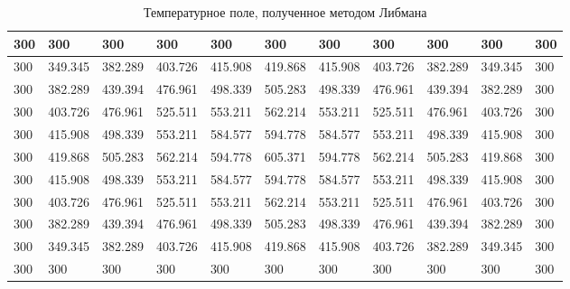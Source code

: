 \documentclass[12pt, a4paper]{article}
\begin{document}
\begin{table}[ht]
	\small
	\caption{Температурное поле, полученное методом Либмана}
	\label{tbl:liebman}
	\begin{tabular}{|l|l|l|l|l|l|l|l|l|l|l|}
		\hline
		300 & 300     & 300     & 300     & 300     & 300     & 300     & 300     & 300     & 300     & 300 \\ \hline
		300 & 349.345 & 382.289 & 403.726 & 415.908 & 419.868 & 415.908 & 403.726 & 382.289 & 349.345 & 300 \\ \hline
		300 & 382.289 & 439.394 & 476.961 & 498.339 & 505.283 & 498.339 & 476.961 & 439.394 & 382.289 & 300 \\ \hline
		300 & 403.726 & 476.961 & 525.511 & 553.211 & 562.214 & 553.211 & 525.511 & 476.961 & 403.726 & 300 \\ \hline
		300 & 415.908 & 498.339 & 553.211 & 584.577 & 594.778 & 584.577 & 553.211 & 498.339 & 415.908 & 300 \\ \hline
		300 & 419.868 & 505.283 & 562.214 & 594.778 & 605.371 & 594.778 & 562.214 & 505.283 & 419.868 & 300 \\ \hline
		300 & 415.908 & 498.339 & 553.211 & 584.577 & 594.778 & 584.577 & 553.211 & 498.339 & 415.908 & 300 \\ \hline
		300 & 403.726 & 476.961 & 525.511 & 553.211 & 562.214 & 553.211 & 525.511 & 476.961 & 403.726 & 300 \\ \hline
		300 & 382.289 & 439.394 & 476.961 & 498.339 & 505.283 & 498.339 & 476.961 & 439.394 & 382.289 & 300 \\ \hline
		300 & 349.345 & 382.289 & 403.726 & 415.908 & 419.868 & 415.908 & 403.726 & 382.289 & 349.345 & 300 \\ \hline
		300 & 300     & 300     & 300     & 300     & 300     & 300     & 300     & 300     & 300     & 300 \\ \hline
	\end{tabular}
\end{table}
\end{document}
